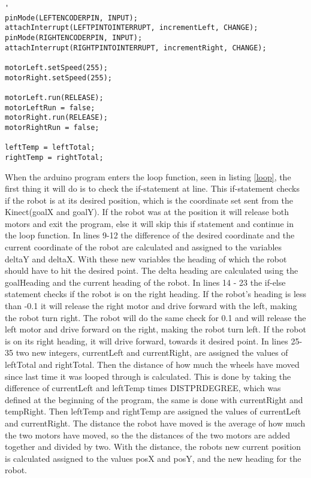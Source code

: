 \begin{lstlisting}[caption={The setup function}, label={setup}]'
pinMode(LEFTENCODERPIN, INPUT);
attachInterrupt(LEFTPINTOINTERRUPT, incrementLeft, CHANGE);
pinMode(RIGHTENCODERPIN, INPUT);
attachInterrupt(RIGHTPINTOINTERRUPT, incrementRight, CHANGE);

motorLeft.setSpeed(255);
motorRight.setSpeed(255);

motorLeft.run(RELEASE);
motorLeftRun = false;
motorRight.run(RELEASE);
motorRightRun = false;

leftTemp = leftTotal;
rightTemp = rightTotal;
\end{lstlisting}

When the arduino program enters the loop function, seen in listing \ref{loop}, the first thing it will do is to check the if-statement at line. This if-statement checks if the robot is at its desired position, which is the coordinate set sent from the Kinect(goalX and goalY). If the robot was at the position it will release both motors and exit the program, else it will skip this if statement and continue in the loop function. \newline
In lines 9-12 the difference of the desired coordinate and the current coordinate of the robot are calculated and assigned to the variables deltaY and deltaX. With these new variables the heading of which the robot should have to hit the desired point. The delta heading are calculated using the goalHeading and the current heading of the robot.\newline
In lines 14 - 23 the if-else statement checks if the robot is on the right heading. If the robot's heading is less than -0.1 it will release the right motor and drive forward with the left, making the robot turn right. The robot will do the same check for 0.1 and will release the left motor and drive forward on the right, making the robot turn left. If the robot is on its right heading, it will drive forward, towards it desired point. \newline
In lines 25-35 two new integers, currentLeft and currentRight, are assigned the values of leftTotal and rightTotal. Then the distance of how much the wheels have moved since last time it was looped through is calculated. This is done by taking the difference of currentLeft and leftTemp times DISTPRDEGREE, which was defined at the beginning of the program, the same is done with currentRight and tempRight. Then leftTemp and rightTemp are assigned the values of currentLeft and currentRight. \newline
The distance the robot have moved is the average of how much the two motors have moved, so the the distances of the two motors are added together and divided by two. With the distance, the robots new current position is calculated assigned to the values posX and posY, and the new heading for the robot.



